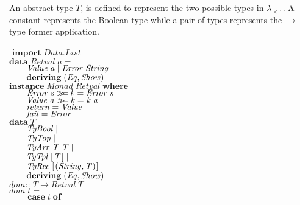 \documentclass[10pt]{article}
\newlength{\lwidth}\setlength{\lwidth}{4.5cm}
\newlength{\cwidth}\setlength{\cwidth}{8mm} %
\newcommand{\Conid}[1]{\mathit{#1}}
\newcommand{\Varid}[1]{\mathit{#1}}
\newcommand{\bind}{\mathbin{>\!\!\!>\mkern-6.7mu=}}
\begin{document}
An abstract type \ensuremath{\Varid{T}}, is defined to represent the two possible
types in $\lambda_{<:}$.  A constant represents the Boolean
type while a pair of types represents the $\rightarrow$ type former
application.

\begin{tabbing}
\qquad\=\hspace{\lwidth}\=\hspace{\cwidth}\=\+\kill
${\mathbf{import}\;\Conid{\Conid{Data}.List}}$\\
${\mathbf{data}\;\Conid{Retval}\;\Varid{a}\mathrel{=}}$\\
${\hskip2.00em\relax\Conid{Value}\;\Varid{a}\mid \Conid{Error}\;\Conid{String}}$\\
${\hskip2.00em\relax\mathbf{deriving}\;(\Conid{Eq},\Conid{Show})}$\\
${}$\\
${\mathbf{instance}\;\Conid{Monad}\;\Conid{Retval}\;\mathbf{where}}$\\
${\hskip2.00em\relax\Conid{Error}\;\Varid{s}\bind \Varid{k}\mathrel{=}\Conid{Error}\;\Varid{s}}$\\
${\hskip2.00em\relax\Conid{Value}\;\Varid{a}\bind \Varid{k}\mathrel{=}\Varid{k}\;\Varid{a}}$\\
${\hskip2.00em\relax\Varid{return}\mathrel{=}\Conid{Value}}$\\
${\hskip2.00em\relax\Varid{fail}\mathrel{=}\Conid{Error}}$\\
${}$\\
${\mathbf{data}\;\Varid{T}\mathrel{=}}$\\
${\hskip2.00em\relax\Conid{TyBool}\mid }$\\
${\hskip2.00em\relax\Conid{TyTop}\mid }$\\
${\hskip2.00em\relax\Conid{TyArr}\;\Varid{T}\;\Varid{T}\mid }$\\
${\hskip2.00em\relax\Conid{TyTpl}\;[\mskip1.5mu \Varid{T}\mskip1.5mu]\mid }$\\
${\hskip2.00em\relax\Conid{TyRec}\;[\mskip1.5mu (\Conid{String},\Varid{T})\mskip1.5mu]}$\\
${\hskip2.00em\relax\mathbf{deriving}\;(\Conid{Eq},\Conid{Show})}$\\
${}$\\
${\Varid{dom}\mathbin{::}\Varid{T}\to \Conid{Retval}\;\Varid{T}}$\\
${\Varid{dom}\;\Varid{t}\mathrel{=}}$\\
${\phantom{\Varid{dom}\;\mbox{}}\mathbf{case}\;\Varid{t}\;\mathbf{of}}$\\

\end{tabbing}
\end{document}
